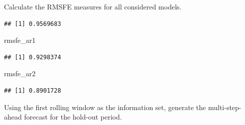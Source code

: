 \documentclass[
  12pt,
  oneside]{book}
\newenvironment{Shaded}{\begin{snugshade}}{\end{snugshade}}
\newcommand{\AttributeTok}[1]{\textcolor[rgb]{0.77,0.63,0.00}{#1}}
\newcommand{\DecValTok}[1]{\textcolor[rgb]{0.00,0.00,0.81}{#1}}
\newcommand{\FunctionTok}[1]{\textcolor[rgb]{0.00,0.00,0.00}{#1}}
\newcommand{\NormalTok}[1]{#1}
\newcommand{\OtherTok}[1]{\textcolor[rgb]{0.56,0.35,0.01}{#1}}
\newcommand{\SpecialCharTok}[1]{\textcolor[rgb]{0.00,0.00,0.00}{#1}}
\newcommand{\StringTok}[1]{\textcolor[rgb]{0.31,0.60,0.02}{#1}}
\begin{document}
Calculate the RMSFE measures for all considered models.

\begin{Shaded}
\end{Shaded}

\begin{verbatim}
## [1] 0.9569683
\end{verbatim}

\begin{Shaded}
\begin{Highlighting}[]
\NormalTok{rmsfe\_ar1}
\end{Highlighting}
\end{Shaded}

\begin{verbatim}
## [1] 0.9298374
\end{verbatim}

\begin{Shaded}
\begin{Highlighting}[]
\NormalTok{rmsfe\_ar2}
\end{Highlighting}
\end{Shaded}

\begin{verbatim}
## [1] 0.8901728
\end{verbatim}

Using the first rolling window as the information set, generate the multi-step-ahead forecast for the hold-out period.
\end{document}
